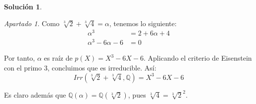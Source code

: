 \documentclass[a4paper, 11pt]{article}
\theoremstyle{definition}
\newtheorem*{solucion}{Solución}
\theoremstyle{remark}
\newtheorem{apartado}{Apartado}[ejercicio]
\begin{document}
\begin{solucion}
\begin{apartado}
          Como $\sqrt[3]{2} + \sqrt[3]{4} = \alpha$, tenemos lo siguiente:
          \begin{align*}
              \alpha^3 &= 2 + 6\alpha + 4 \\
              \alpha^3 - 6\alpha - 6 &= 0
          \end{align*}

          Por tanto, $\alpha$ es raíz de $p(X) = X^3-6X-6$. Aplicando el criterio de Eisenstein con el primo 3, concluimos que es irreducible. Así:
          \[
          Irr(\sqrt[3]{2} + \sqrt[3]{4},\mathbb{Q}) = X^3-6X-6
          \]

          Es claro además que $\mathbb{Q}(\alpha) = \mathbb{Q}(\sqrt[3]{2})$, pues $\sqrt[3]{4} = \sqrt[3]{2} ^ 2$.
      \end{apartado}
  \end{solucion}
\end{document}
